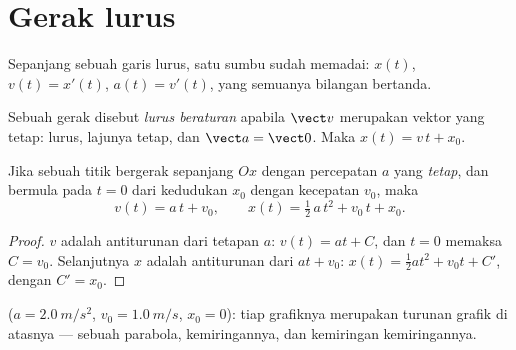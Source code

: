 \section{Gerak lurus}

Sepanjang sebuah garis lurus, satu sumbu sudah memadai: $x(t)$,
$v(t) = x'(t)$, $a(t) = v'(t)$, yang semuanya bilangan bertanda.

\begin{definition}\label{def:g12:kinematics-2d:uniform}
Sebuah gerak disebut \emph{lurus beraturan} apabila $\vect v$ merupakan vektor yang tetap: 
lurus, lajunya tetap, dan $\vect a = \vect 0$. Maka
$x(t) = v\,t + x_0$.
\end{definition}

\begin{proposition}\label{prop:g12:kinematics-2d:uarm}
%
Jika sebuah titik bergerak sepanjang $Ox$ dengan percepatan $a$ yang
\emph{tetap}, dan bermula pada $t = 0$ dari kedudukan $x_0$ dengan
kecepatan $v_0$, maka
\[
v(t) = a\,t + v_0,
\qquad
x(t) = \tfrac12\,a\,t^2 + v_0\,t + x_0 .
\]
\end{proposition}

\begin{proof}
$v$ adalah antiturunan dari tetapan $a$: $v(t) = a t + C$, dan $t = 0$
memaksa $C = v_0$. Selanjutnya $x$ adalah antiturunan dari
$a t + v_0$: $x(t) = \tfrac12 a t^2 + v_0 t + C'$, dengan $C' = x_0$.
\end{proof}

\begin{omfigure}

{\small {} ($a = \qty{2.0}{m/s^2}$,
$v_0 = \qty{1.0}{m/s}$, $x_0 = 0$): tiap grafiknya merupakan turunan
grafik di atasnya --- sebuah parabola, kemiringannya, dan kemiringan
kemiringannya.}
\end{omfigure}

